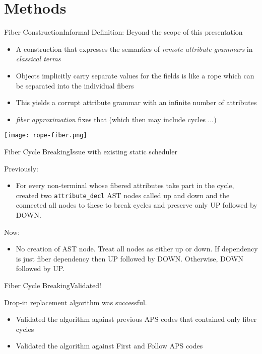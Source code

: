 \section{Methods}


\begin{frame}{Fiber Construction}{Informal Definition: Beyond the scope of this presentation}

\small
\begin{itemize}
    \item A construction that expresses the semantics of \emph{remote attribute grammars} in \emph{classical terms}
    \item Objects implicitly carry separate values for the fields is like a \alert{rope} which can be separated into the individual fibers
    \item This yields a corrupt attribute grammar with an infinite number of attributes
    \item \emph{fiber approximation} fixes that (which then may include cycles ...)
\end{itemize}

\begin{center}
\texttt{[image: rope-fiber.png]}
\end{center}
    

\end{frame}

\begin{frame}{Fiber Cycle Breaking}{Issue with existing static scheduler}
    
Previously:
\begin{itemize}
    \item For every non-terminal whose fibered attributes take part in the cycle, created two \texttt{attribute\_decl} \alert{AST nodes} called up and down and the connected all nodes to these to break cycles and preserve only UP followed by DOWN.
\end{itemize}

Now:

\begin{itemize}
    \item \alert{No creation of AST node}. Treat all nodes as either up or down. If dependency is just fiber dependency then UP followed by DOWN. Otherwise, DOWN followed by UP.
\end{itemize}

\end{frame}


\begin{frame}{Fiber Cycle Breaking}{Validated!}

\alert{Drop-in replacement} algorithm was successful.

\begin{itemize}
    \item Validated the algorithm against \alert{previous APS codes} that contained only fiber cycles
    \item Validated the algorithm against \alert{First and Follow} APS codes 
\end{itemize}

\end{frame}


